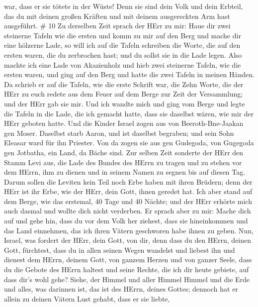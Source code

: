 war, dass er sie tötete in der Wüste!  Denn sie sind dein
Volk und dein Erbteil, das du mit deinen großen Kräften und mit deinem
ausgereckten Arm hast ausgeführt. \# 10  Zu derselben Zeit
sprach der HErr zu mir: Haue dir zwei steinerne Tafeln wie die ersten
und komm zu mir auf den Berg und mache dir eine hölzerne Lade,
 so will ich auf die Tafeln schreiben die Worte, die auf den
ersten waren, die du zerbrochen hast; und du sollst sie in die Lade
legen.  Also machte ich eine Lade von Akazienholz und hieb
zwei steinerne Tafeln, wie die ersten waren, und ging auf den Berg und
hatte die zwei Tafeln in meinen Händen.  Da schrieb er auf
die Tafeln, wie die erste Schrift war, die Zehn Worte, die der HErr zu
euch redete aus dem Feuer auf dem Berge zur Zeit der Versammlung; und
der HErr gab sie mir.  Und ich wandte mich und ging vom
Berge und legte die Tafeln in die Lade, die ich gemacht hatte, dass sie
daselbst wären, wie mir der HErr geboten hatte.  Und die
Kinder Israel zogen aus von Beeroth-Bne-Jaakan gen Moser. Daselbst starb
Aaron, und ist daselbst begraben; und sein Sohn Eleasar ward für ihn
Priester.  Von da zogen sie aus gen Gudegoda, von Gugegoda
gen Jotbatha, ein Land, da Bäche sind.  Zur selben Zeit
sonderte der HErr den Stamm Levi aus, die Lade des Bundes des HErrn zu
tragen und zu stehen vor dem HErrn, ihm zu dienen und in seinem Namen zu
segnen bis auf diesen Tag.  Darum sollen die Leviten kein
Teil noch Erbe haben mit ihren Brüdern; denn der HErr ist ihr Erbe, wie
der HErr, dein Gott, ihnen geredet hat.  Ich aber stand auf
dem Berge, wie das erstemal, 40 Tage und 40 Nächte; und der HErr erhörte
mich auch dasmal und wollte dich nicht verderben.  Er
sprach aber zu mir: Mache dich auf und gehe hin, dass du vor dem Volk
her ziehest, dass sie hineinkommen und das Land einnehmen, das ich ihren
Vätern geschworen habe ihnen zu geben.  Nun, Israel, was
fordert der HErr, dein Gott, von dir, denn dass du den HErrn, deinen
Gott, fürchtest, dass du in allen seinen Wegen wandelst und liebest ihn
und dienest dem HErrn, deinem Gott, von ganzem Herzen und von ganzer
Seele,  dass du die Gebote des HErrn haltest und seine
Rechte, die ich dir heute gebiete, auf dass dir's wohl gehe?
 Siehe, der Himmel und aller Himmel Himmel und die Erde und
alles, was darinnen ist, das ist des HErrn, deines Gottes; 
dennoch hat er allein zu deinen Vätern Lust gehabt, dass er sie liebte,
